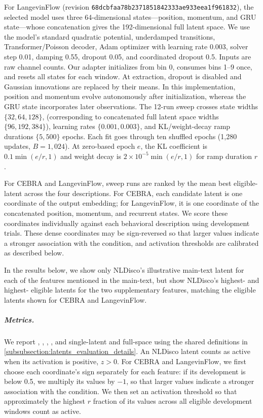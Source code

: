 For LangevinFlow (revision \texttt{68dcbfaa78b2371851842333ae933eea1f961832}), the selected model uses three 64-dimensional states---position, momentum, and GRU state---whose concatenation gives the 192-dimensional full latent space. We use the model's standard quadratic potential, underdamped transitions, Transformer/Poisson decoder, Adam optimizer with learning rate 0.003, solver step 0.01, damping 0.55, dropout 0.05, and coordinated dropout 0.5. Inputs are raw channel counts. Our adapter initializes from bin 0, consumes bins 1--9 once, and resets all states for each window. At extraction, dropout is disabled and Gaussian innovations are replaced by their means. In this implementation, position and momentum evolve autonomously after initialization, whereas the GRU state incorporates later observations. The 12-run sweep crosses state widths $\{32,64,128\}$, (corresponding to concatenated full latent space widths $\{96,192,384\}$), learning rates $\{0.001,0.003\}$, and KL/weight-decay ramp durations $\{5,500\}$ epochs. Each fit goes through ten shuffled epochs (1,280 updates, $B=1,024$). At zero-based epoch $e$, the KL coefficient is $0.1\min(e/r,1)$ and weight decay is $2\times10^{-5}\min(e/r,1)$ for ramp duration $r$.



For CEBRA and LangevinFlow, sweep runs are ranked by the mean best eligible-latent  across the four descriptions. For CEBRA, each candidate latent is one coordinate of the output embedding; for LangevinFlow, it is one coordinate of the concatenated position, momentum, and recurrent states. We score these coordinates individually against each behavioral description using development trials. These dense coordinates may be sign-reversed so that larger values indicate a stronger association with the condition, and activation thresholds are calibrated as described below.

In the results below, we show only NLDisco's illustrative main-text latent for each of the features mentioned in the main-text, but show NLDisco's highest- and highest- eligible latents for the two supplementary features, matching the eligible latents shown for CEBRA and LangevinFlow.

\subparagraph{Metrics.}
We report , , , , and single-latent and full-space  using the shared definitions in \hyperref[subsubsection:latents_evaluation_details]{\ref*{subsubsection:latents_evaluation_details}}. An NLDisco latent counts as active when its activation is positive, $z>0$. For CEBRA and LangevinFlow, we first choose each coordinate's sign separately for each feature: if its development  is below 0.5, we multiply its values by $-1$, so that larger values indicate a stronger association with the condition. We then set an activation threshold so that approximately the highest $r$ fraction of its values across all eligible development windows count as active.

